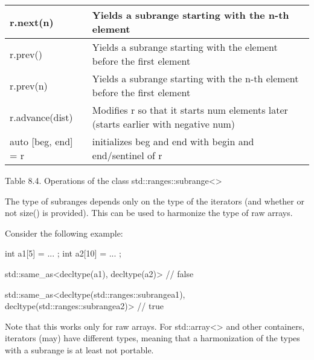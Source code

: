 \begin{longtable}[c]{|l|l|}
	r.next(n)               & Yields a subrange starting with the n-th element                          \\ \hline
	r.prev()                & Yields a subrange starting with the element before the first element      \\ \hline
	r.prev(n)               & Yields a subrange starting with the n-th element before the first element \\ \hline
	r.advance(dist)                & Modifies r so that it starts num elements later (starts earlier with negative num)                       \\ \hline
	auto {[}beg, end{]} = r & initializes beg and end with begin and end/sentinel of r                  \\ \hline
\end{longtable}

\begin{center}
Table 8.4. Operations of the class std::ranges::subrange<>
\end{center}


The type of subranges depends only on the type of the iterators (and whether or not size() is provided).
This can be used to harmonize the type of raw arrays.

Consider the following example:

\begin{cpp}
int a1[5] = { ... };
int a2[10] = { ... };

std::same_as<decltype(a1), decltype(a2)> // false

std::same_as<decltype(std::ranges::subrange{a1}),
			 decltype(std::ranges::subrange{a2})> // true
\end{cpp}

Note that this works only for raw arrays. For std::array<> and other containers, iterators (may) have different types, meaning that a harmonization of the types with a subrange is at least not portable.


